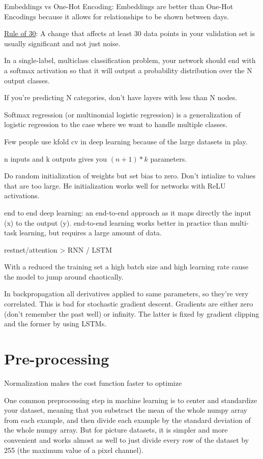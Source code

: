 \documentclass[]{book}
\begin{document}
Embeddings vs One-Hot Encoding: Embeddings are better than One-Hot
Encodings because it allows for relationships to be shown between days.

\href{https://www.youtube.com/watch?v=nqEYVzJLR_c\&feature=youtu.be\&t=31}{Rule
of 30}: A change that affects at least 30 data points in your validation
set is usually significant and not just noise.

In a single-label, multiclass classification problem, your network
should end with a softmax activation so that it will output a
probability distribution over the N output classes.

If you're predicting N categories, don't have layers with less than N
nodes.

Softmax regression (or multinomial logistic regression) is a
generalization of logistic regression to the case where we want to
handle multiple classes.

Few people use kfold cv in deep learning because of the large datasets
in play.

n inputs and k outputs gives you \((n+1)*k\) parameters.

Do random initialization of weights but set bias to zero. Don't
intialize to values that are too large. He initialization works well for
networks with ReLU activations.

end to end deep learning: an end-to-end approach as it maps directly the
input (x) to the output (y). end-to-end learning works better in
practice than multi-task learning, but requires a large amount of data.

restnet/attention \textgreater{} RNN / LSTM

With a reduced the training set a high batch size and high learning rate
cause the model to jump around chaotically.

In backpropagation all derivatives applied to same parameters, so
they're very correlated. This is bad for stochastic gradient descent.
Gradients are either zero (don't remember the past well) or infinity.
The latter is fixed by gradient clipping and the former by using LSTMs.

\section{Pre-processing}\label{pre-processing-1}

Normalization makes the cost function faster to optimize

One common preprocessing step in machine learning is to center and
standardize your dataset, meaning that you substract the mean of the
whole numpy array from each example, and then divide each example by the
standard deviation of the whole numpy array. But for picture datasets,
it is simpler and more convenient and works almost as well to just
divide every row of the dataset by 255 (the maximum value of a pixel
channel).
\end{document}
